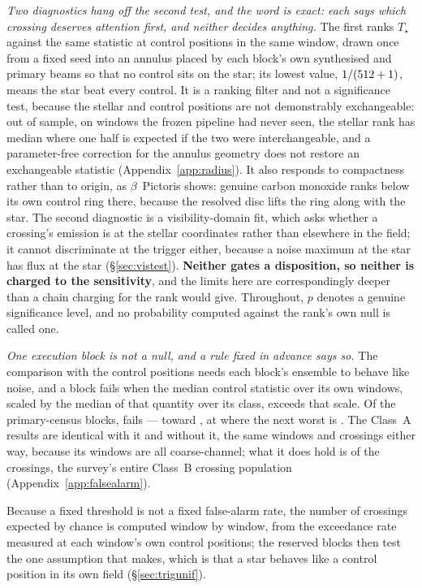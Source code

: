 \emph{Two diagnostics hang off the second test, and the word is exact: each
says which crossing deserves attention first, and neither decides anything.}
The first ranks $T_\star$ against the same statistic at \NCtrl{} control
positions in the same window, drawn once from a fixed seed into an annulus
placed by each block's own synthesised and primary beams so that no control
sits on the star; its lowest value, $1/(512+1)$, means the star beat every
control. It is a ranking filter and not a significance test, because the
stellar and control positions are not demonstrably exchangeable: out of
sample, on \HoWin{} windows the frozen pipeline had never seen, the stellar
rank has median \HoRankMed{} where one half is expected if the two were
interchangeable, and a parameter-free correction for the annulus geometry
does not restore an exchangeable statistic (Appendix~\ref{app:radius}). It
also responds to compactness rather than to origin, as $\beta$~Pictoris
shows: genuine carbon monoxide ranks below its own control ring there,
because the resolved disc lifts the ring along with the star. The second
diagnostic is a visibility-domain fit, which asks whether a crossing's
emission is at the stellar coordinates rather than elsewhere in the field; it
cannot discriminate at the trigger either, because a noise maximum at the
star has flux at the star (\S\ref{sec:vistest}). \textbf{Neither gates a
disposition, so neither is charged to the sensitivity}, and the limits here
are correspondingly deeper than a chain charging for the rank would give.
Throughout, $p$ denotes a genuine significance level, and no probability
computed against the rank's own null is called one.

\emph{One execution block is not a null, and a rule fixed in advance says so.}
The comparison with the control positions needs each block's ensemble to behave
like noise, and a block fails when the median control statistic over its own
windows, scaled by the median of that quantity over its class, exceeds
\BqFactor{} that scale. Of the \BqNBlocks{} primary-census blocks, \BqNFail{}
fails --- \BqFailBlock{} toward \BqFailStar, at \BqFailQ{} where the next worst
is \BqNextQ. The Class~A results are identical with it and without it,
the same \BqWinACut{} windows and \BqXrossACut{} crossings either way, because
its \BqFailNWin{} windows are all coarse-channel; what it does hold is
\BqFailNCross{} of the \NCross{} crossings, the survey's entire Class~B
crossing population (Appendix~\ref{app:falsealarm}).

Because a fixed threshold is not a fixed false-alarm rate, the number of
crossings expected by chance is computed window by window, from the
exceedance rate measured at each window's own control positions; the reserved
blocks then test the one assumption that makes, which is that a star behaves
like a control position in its own field (\S\ref{sec:trigunif}).

